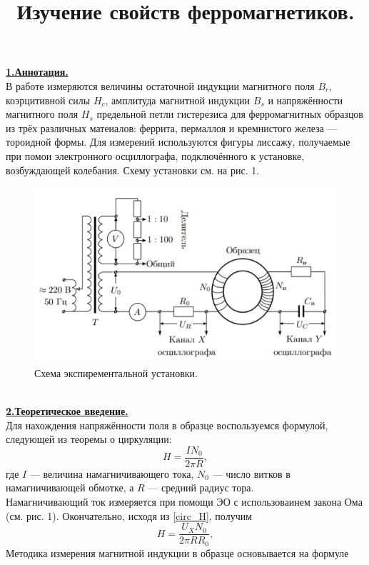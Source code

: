 \documentclass[12pt, letterpaper, oneside]{article}
\title{Изучение свойств ферромагнетиков.}
\begin{document}
\maketitle
\noindent\textbf{\underline{1.Аннотация.}}\\
В работе измеряются величины остаточной индукции магнитного поля $B_r$, коэрцитивной силы $H_c$, амплитуда магнитной индукции $B_s$ и напряжённости магнитного поля $H_s$ предельной петли гистерезиса для ферромагнитных образцов из трёх различных матеиалов: феррита, пермаллоя и кремнистого железа — тороидной формы. Для измерений используются фигуры лиссажу, получаемые при помои электронного осциллографа, подключённого к установке, возбуждающей колебания. Схему установки см. на рис. 1.\\
\begin{figure}[h]
\centering
\includegraphics{scheme.png}
\caption{Схема экспирементальной установки.}
\end{figure}\\
\textbf{\underline{2.Теоретическое введение.}}\\
Для нахождения напряжённости поля в образце воспользуемся формулой, следующей из теоремы о циркуляции:
\begin{equation}\label{circ_H}
H = \frac{I N_0}{2\pi R},
\end{equation}
где $I$ — величина намагничивающего тока, $N_0$ — число витков в намагничивающей обмотке, а $R$ — средний радиус тора.\\
Намагничивающий ток измеряется при помощи ЭО с использоваинем закона Ома (см. рис. 1). Окончательно, исходя из \ref{circ_H}, получим
\begin{equation}\label{X_formula}
H = \frac{U_X N_0}{2\pi R R_0},
\end{equation}
Методика измерения магнитной индукции в образце основывается на формуле
\end{document}
